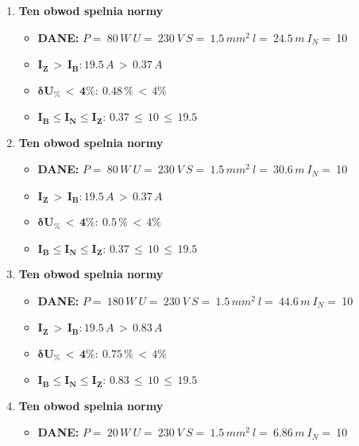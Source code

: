 \begin{enumerate}
\begin{itemize}
\end{itemize}
\item \textcolor{Green}{\cmark} \textbf{Ten obwod spelnia normy} 
\begin{itemize}
\item[] \textbf{DANE: } \: $ P = \:80\, W\: U = \:230\: V\: S = \:1.5\, mm^2\: l = \:24.5\, m\: I_N= \: $10
\item[\textcolor{Green}{\cmark}] $ \pmb{I_Z \, >  \, I_B: }19.5 \, A \, > \,0.37 \, A $
\item[\textcolor{Green}{\cmark}] $ \pmb{ \delta U_\% \, < \, 4\%:} \:0.48 \, \% \,< \, 4\% $
\item[\textcolor{Green}{\cmark}] $ \pmb{I_B \le I_N \le I_Z: } \, 0.37 \, \le \,10 \, \le \,19.5 $
\end{itemize}
\item \textcolor{Green}{\cmark} \textbf{Ten obwod spelnia normy} 
\begin{itemize}
\item[] \textbf{DANE: } \: $ P = \:80\, W\: U = \:230\: V\: S = \:1.5\, mm^2\: l = \:30.6\, m\: I_N= \: $10
\item[\textcolor{Green}{\cmark}] $ \pmb{I_Z \, >  \, I_B: }19.5 \, A \, > \,0.37 \, A $
\item[\textcolor{Green}{\cmark}] $ \pmb{ \delta U_\% \, < \, 4\%:} \:0.5 \, \% \,< \, 4\% $
\item[\textcolor{Green}{\cmark}] $ \pmb{I_B \le I_N \le I_Z: } \, 0.37 \, \le \,10 \, \le \,19.5 $
\end{itemize}
\item \textcolor{Green}{\cmark} \textbf{Ten obwod spelnia normy} 
\begin{itemize}
\item[] \textbf{DANE: } \: $ P = \:180\, W\: U = \:230\: V\: S = \:1.5\, mm^2\: l = \:44.6\, m\: I_N= \: $10
\item[\textcolor{Green}{\cmark}] $ \pmb{I_Z \, >  \, I_B: }19.5 \, A \, > \,0.83 \, A $
\item[\textcolor{Green}{\cmark}] $ \pmb{ \delta U_\% \, < \, 4\%:} \:0.75 \, \% \,< \, 4\% $
\item[\textcolor{Green}{\cmark}] $ \pmb{I_B \le I_N \le I_Z: } \, 0.83 \, \le \,10 \, \le \,19.5 $
\end{itemize}
\item \textcolor{Green}{\cmark} \textbf{Ten obwod spelnia normy} 
\begin{itemize}
\item[] \textbf{DANE: } \: $ P = \:20\, W\: U = \:230\: V\: S = \:1.5\, mm^2\: l = \:6.86\, m\: I_N= \: $10

\end{itemize}
\end{enumerate}
